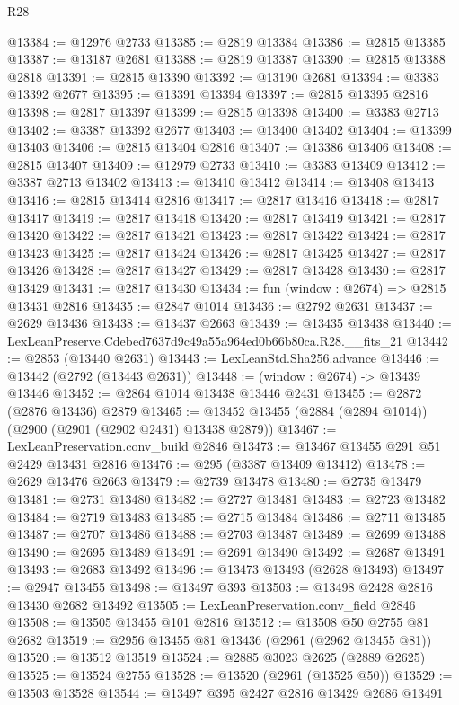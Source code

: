 \begin{lexlean}{R28}
\begin{coremodule}
@13384 := @12976 @2733
@13385 := @2819 @13384
@13386 := @2815 @13385
@13387 := @13187 @2681
@13388 := @2819 @13387
@13390 := @2815 @13388 @2818
@13391 := @2815 @13390
@13392 := @13190 @2681
@13394 := @3383 @13392 @2677
@13395 := @13391 @13394
@13397 := @2815 @13395 @2816
@13398 := @2817 @13397
@13399 := @2815 @13398
@13400 := @3383 @2713
@13402 := @3387 @13392 @2677
@13403 := @13400 @13402
@13404 := @13399 @13403
@13406 := @2815 @13404 @2816
@13407 := @13386 @13406
@13408 := @2815 @13407
@13409 := @12979 @2733
@13410 := @3383 @13409
@13412 := @3387 @2713 @13402
@13413 := @13410 @13412
@13414 := @13408 @13413
@13416 := @2815 @13414 @2816
@13417 := @2817 @13416
@13418 := @2817 @13417
@13419 := @2817 @13418
@13420 := @2817 @13419
@13421 := @2817 @13420
@13422 := @2817 @13421
@13423 := @2817 @13422
@13424 := @2817 @13423
@13425 := @2817 @13424
@13426 := @2817 @13425
@13427 := @2817 @13426
@13428 := @2817 @13427
@13429 := @2817 @13428
@13430 := @2817 @13429
@13431 := @2817 @13430
@13434 := fun (window : @2674) => @2815 @13431 @2816
@13435 := @2847 @1014
@13436 := @2792 @2631
@13437 := @2629 @13436
@13438 := @13437 @2663
@13439 := @13435 @13438
@13440 := LexLeanPreserve.Cdebed7637d9c49a55a964ed0b66b80ca.R28.__fits_21
@13442 := @2853 (@13440 @2631)
@13443 := LexLeanStd.Sha256.advance
@13446 := @13442 (@2792 (@13443 @2631))
@13448 := (window : @2674) -> @13439 @13446
@13452 := @2864 @1014 @13438 @13446 @2431
@13455 := @2872 (@2876 @13436) @2879
@13465 := @13452 @13455 (@2884 (@2894 @1014)) (@2900 (@2901 (@2902 @2431) @13438 @2879))
@13467 := LexLeanPreservation.conv_build @2846
@13473 := @13467 @13455 @291 @51 @2429 @13431 @2816
@13476 := @295 (@3387 @13409 @13412)
@13478 := @2629 @13476 @2663
@13479 := @2739 @13478
@13480 := @2735 @13479
@13481 := @2731 @13480
@13482 := @2727 @13481
@13483 := @2723 @13482
@13484 := @2719 @13483
@13485 := @2715 @13484
@13486 := @2711 @13485
@13487 := @2707 @13486
@13488 := @2703 @13487
@13489 := @2699 @13488
@13490 := @2695 @13489
@13491 := @2691 @13490
@13492 := @2687 @13491
@13493 := @2683 @13492
@13496 := @13473 @13493 (@2628 @13493)
@13497 := @2947 @13455
@13498 := @13497 @393
@13503 := @13498 @2428 @2816 @13430 @2682 @13492
@13505 := LexLeanPreservation.conv_field @2846
@13508 := @13505 @13455 @101 @2816
@13512 := @13508 @50 @2755 @81 @2682
@13519 := @2956 @13455 @81 @13436 (@2961 (@2962 @13455 @81))
@13520 := @13512 @13519
@13524 := @2885 @3023 @2625 (@2889 @2625)
@13525 := @13524 @2755
@13528 := @13520 (@2961 (@13525 @50))
@13529 := @13503 @13528
@13544 := @13497
    @395
    @2427
    @2816
    @13429
    @2686
    @13491

\end{coremodule}
\end{lexlean}
